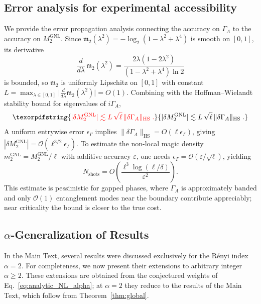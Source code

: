 \documentclass[prx,twocolumn,superscriptaddress,aps,10pt, frontmatterverbose, reprint,footinbib,longbibliography=true]{revtex4-2}
\providecommand{\DIFaddtex}[1]{{\protect\color{red}#1}} %
\providecommand{\DIFaddbegin}{\protect\color{red}} %
\providecommand{\DIFaddend}{\protect\color{black}} %
\providecommand{\DIFaddtex}[1]{\texorpdfstring{\DIFaddtex{#1}}{#1}} %
\providecommand{\DIFadd}[1]{\texorpdfstring{\DIFaddtex{#1}}{#1}} %
\newcommand{\DIFaddincludegraphics}[2][]{{\color{blue}\fbox{\DIFOincludegraphics[#1]{#2}}}} %
\DeclareRobustCommand{\DIFaddbegin}{\DIFOaddbegin \let\includegraphics\DIFaddincludegraphics} %
\DeclareRobustCommand{\DIFaddend}{\DIFOaddend \let\includegraphics\DIFOincludegraphics} %
\begin{document}
\subsection{Error analysis for experimental accessibility}
\label{app:experimental}
We provide the error propagation analysis connecting the accuracy on $\Gamma_A$ to the accuracy on $M_2^{\mathrm{GNL}}$.
Since $\mathfrak{m}_2(\lambda^2) = -\log_2(1-\lambda^2+\lambda^4)$ is smooth on $[0,1]$, its derivative
\begin{equation}
    \frac{d}{d\lambda}\,\mathfrak{m}_2(\lambda^2) = \frac{2\lambda(1-2\lambda^2)}{(1-\lambda^2+\lambda^4)\ln 2}
\end{equation}
is bounded, so $\mathfrak{m}_2$ is uniformly Lipschitz on $[0,1]$ with constant $L = \max_{\lambda \in [0,1]} \bigl|\frac{d}{d\lambda}\mathfrak{m}_2(\lambda^2)\bigr| = O(1)$.
Combining with the Hoffman--Wielandt stability bound for eigenvalues of $i\Gamma_A$,
\DIFaddbegin \begin{equation}
    \DIFadd{|\delta M_2^{\mathrm{GNL}}| \lesssim L\,\sqrt{\ell}\,\|\delta\Gamma_A\|_{\mathrm{HS}}\;.
}\end{equation}\DIFaddend 
A uniform entrywise error $\epsilon_\Gamma$ implies \DIFaddbegin \DIFadd{$\|\delta\Gamma_A\|_{\mathrm{HS}} = O(\ell \epsilon_\Gamma)$}\DIFaddend , giving $|\delta M_2^{\mathrm{GNL}}| = \mathcal{O}(\ell^{3/2}\epsilon_\Gamma)$.
To estimate the non-local magic density $m_2^{\mathrm{GNL}} = M_2^{\mathrm{GNL}}/\ell$ with additive accuracy $\varepsilon$, one needs $\epsilon_\Gamma = \mathcal{O}(\varepsilon/\sqrt{\ell})$, yielding
\begin{equation}
    N_{\mathrm{shots}} = O\!\left(\frac{\ell^3\log(\ell/\delta)}{\varepsilon^2}\right).
\end{equation}
This estimate is pessimistic for gapped phases, where $\Gamma_A$ is approximately banded and only $\mathcal{O}(1)$ entanglement modes near the boundary contribute appreciably; near criticality the bound is closer to the true cost.

\subsection{$\alpha$-Generalization of Results}
\label{Sec:generaliz}

In the Main Text, several results were discussed exclusively for the Rényi index $\alpha = 2$. For completeness, we now present their extensions to arbitrary integer $\alpha \ge 2$. These extensions are obtained from the conjectured weights of Eq.~\eqref{eq:analytic_NL_alpha}; at $\alpha=2$ they reduce to the results of the Main Text, which follow from Theorem~\ref{thm:global}.
\end{document}
